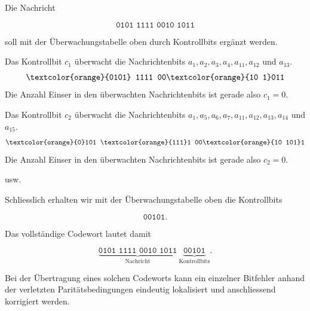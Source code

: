 \begin{myexample}
    Die Nachricht

    \[
        \texttt{0101 1111 0010 1011}
    \]

    soll mit der Überwachungstabelle oben durch Kontrollbits ergänzt werden.

    Das Kontrollbit \(c_1\) überwacht die Nachrichtenbits \(a_1, a_2, a_3, a_4, a_{11}, a_{12}\) und \(a_{13}\).
    \[
        \texttt{\textcolor{orange}{0101} 1111 00\textcolor{orange}{10 1}011}
    \]
    Die Anzahl Einser in den überwachten Nachrichtenbits ist gerade also \(c_1 = 0\).


    Das Kontrollbit \(c_2\) überwacht die Nachrichtenbits \(a_1, a_5, a_6, a_7, a_{11}, a_{12}, a_{13}, a_{14}\) und \(a_{15}\).
    \[
        \texttt{\textcolor{orange}{0}101 \textcolor{orange}{111}1 00\textcolor{orange}{10 101}1}
    \]
    Die Anzahl Einser in den überwachten Nachrichtenbits ist gerade also \(c_2 = 0\).

    usw.

    Schliesslich erhalten wir mit der Überwachungstabelle oben
    die Kontrollbits

    \[
        \texttt{00101}.
    \]

    Das vollständige Codewort lautet damit

    \[
        \underbrace{\texttt{0101 1111 0010 1011}}_{\text{Nachricht}}
        \ \underbrace{\texttt{00101}}_{\text{Kontrollbits}}.
    \]

    Bei der Übertragung eines solchen Codeworts kann ein einzelner
    Bitfehler anhand der verletzten Paritätsbedingungen eindeutig
    lokalisiert und anschliessend korrigiert werden.
\end{myexample}


